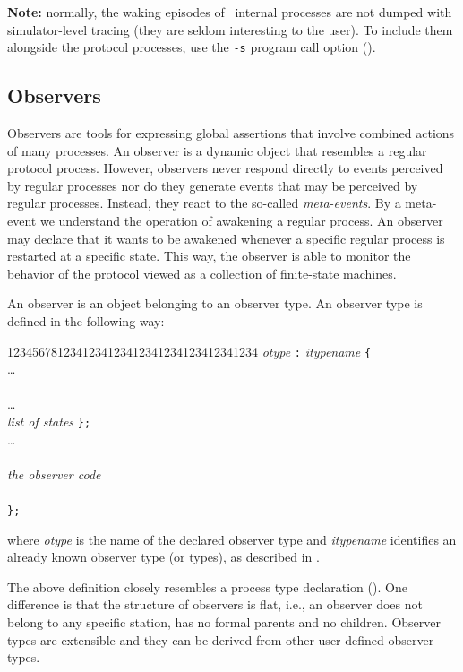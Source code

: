 \noindent
{\bf Note:}
normally, the waking episodes of \smurph\ internal processes are not dumped
with simulator-level tracing
(they are seldom interesting to the user).
To include them alongside the protocol processes, use the {\tt -s} program
call option ().

\subsection{Observers}
\label{rm_ob_ob}

Observers are tools for expressing global assertions that involve combined
actions of many processes.
An observer is a dynamic object that resembles a regular protocol process.
However,
observers never respond directly to events perceived by regular processes
nor do they generate events that may be perceived by regular processes.
Instead, they react to the so-called {\em meta-events}.
By a meta-event we understand the operation of awakening a regular process.
An observer may declare that it wants to be awakened whenever a specific
regular process is restarted at a specific state.
This way, the observer is able to monitor the behavior of the protocol viewed
as a collection of finite-state machines.

An observer is an object belonging to an observer type.
An observer type is defined in the following way:
{\tt\begin{tabbing}
12345678\=1234\=1234\=1234\=1234\=1234\=1234\=1234\=1234\kill
{} {\em otype\/} {\tt :} {\em itypename\/} {\tt \{} \\
\> \>\ldots \\
\>  \\
\> \>\ldots \\
\>  {\em list of states\/} {\tt \};} \\
\> \>\ldots \\
\>  \\
\> \> \> {\em the observer code} \\
\> \>{\tt \};} \\
\> {\tt \};}
\end{tabbing}}
where {\em otype\/} is the name of the declared observer type and
{\em itypename\/} identifies an already known observer type (or types),
as described in .

The above definition closely resembles a process type declaration
().
One difference is that the structure of observers is flat, i.e.,
an observer does not belong to any specific station, has no formal
parents and no children.
Observer types are extensible and they can be derived
from other user-defined observer types.

